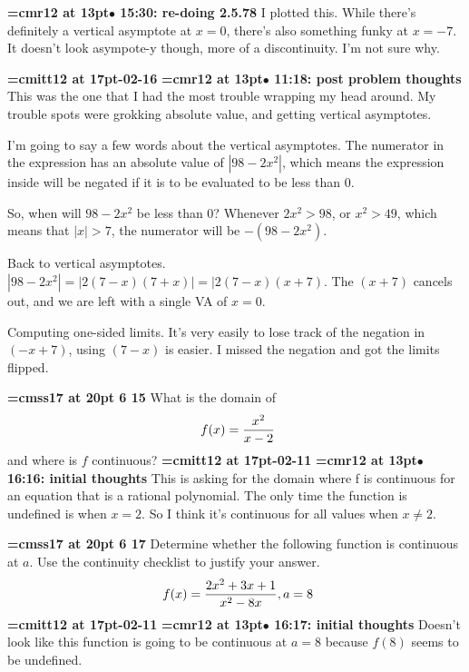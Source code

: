 {\smallskip\noindent\bf\font\titlefont=cmr12 at 13pt\titlefont $\bullet$ 15:30: re-doing 2.5.78}\smallskip
I plotted this. While there's definitely a vertical asymptote at $x = 0$, there's also something funky at $x=-7$. It doesn't look asympote-y though, more of a discontinuity. I'm not sure why. 
\par

{\medskip\noindent\bf\font\titlefont=cmitt12 at 17pt-02-16}\medskip
{\smallskip\noindent\bf\font\titlefont=cmr12 at 13pt\titlefont $\bullet$ 11:18: post problem thoughts}\smallskip
This was the one that I had the most trouble wrapping my head around. My trouble spots were grokking absolute value, and getting vertical asymptotes.
\par

I'm going to say a few words about the vertical asymptotes. The numerator in the expression has an absolute value of $|98 - 2x^2|$, which means the expression inside will be negated if it is to be evaluated to be less than 0.
\par

So, when will $98-2x^2$ be less than 0? Whenever $2x^2 > 98$, or $x^2 > 49$, which means that $|x| > 7$, the numerator will be $-(98 - 2x^2)$.
\par

Back to vertical asymptotes. $|98 - 2x^2| = |2(7 - x)(7 + x)| = |2(7-x)(x+7)$. The $(x + 7)$ cancels out, and we are left with a single VA of $x = 0$.
\par

Computing one-sided limits. It's very easily to lose track of the negation in $(-x + 7)$, using $(7 - x)$ is easier. I missed the negation and got the limits flipped.
\par

{\medskip\noindent\bf\font\titlefont=cmss17 at 20pt 6 15}\medskip
What is the domain of
$$\
f(x) = {
x^2
\over
x - 2
}
$$
and where is $f$ continuous?
{\medskip\noindent\bf\font\titlefont=cmitt12 at 17pt-02-11}\medskip
{\smallskip\noindent\bf\font\titlefont=cmr12 at 13pt\titlefont $\bullet$ 16:16: initial thoughts}\smallskip
This is asking for the domain where f is continuous for an equation that is a rational polynomial. The only time the function is undefined is when $x=2$. So I think it's continuous for all values when $x \ne 2$.
\par

{\medskip\noindent\bf\font\titlefont=cmss17 at 20pt 6 17}\medskip
Determine whether the following function is continuous at
$a$. Use the continuity checklist to justify your answer.
$$\
f(x) = {
2x^2 + 3x + 1
\over
x^2 - 8x
}, a = 8
$$
{\medskip\noindent\bf\font\titlefont=cmitt12 at 17pt-02-11}\medskip
{\smallskip\noindent\bf\font\titlefont=cmr12 at 13pt\titlefont $\bullet$ 16:17: initial thoughts}\smallskip
Doesn't look like this function is going to be continuous at $a = 8$ because $f(8)$ seems to be undefined.
\par

